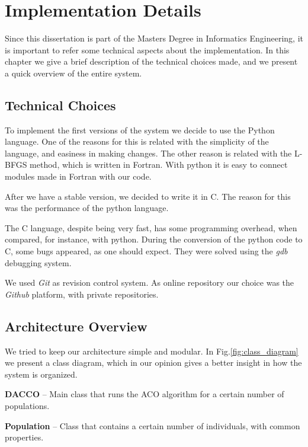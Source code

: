 \chapter{Implementation Details}
\label{chap:implementation}

Since this dissertation is part of the Masters Degree in Informatics Engineering, it is important to refer some technical aspects about the implementation. In this chapter we give a brief description of the technical choices made, and we present a quick overview of the entire system.

\section{Technical Choices}

To implement the first versions of the system we decide to use the Python language. One of the reasons for this is related with the simplicity of the language, and easiness in making changes. The other reason is related with the L-BFGS method, which is written in Fortran. With python it is easy to connect modules made in Fortran with our code.

After we have a stable version, we decided to write it in C. The reason for this was the performance of the python language. 

The C language, despite being very fast, has some programming overhead, when compared, for instance, with python. During the conversion of the python code to C, some bugs appeared, as one should expect. They were solved using the \emph{gdb} debugging system.

We used \emph{Git} as revision control system. As online repository our choice was the \emph{Github} platform, with private repositories.

\section{Architecture Overview}
We tried to keep our architecture simple and modular. In Fig.\ref{fig:class_diagram} we present a class diagram, which in our opinion gives a better insight in how the system is organized.

\pagebreak
\textbf{DACCO} – Main class that runs the ACO algorithm for a certain number of populations.

\textbf{Population} – Class that contains a certain number of individuals, with common properties.


